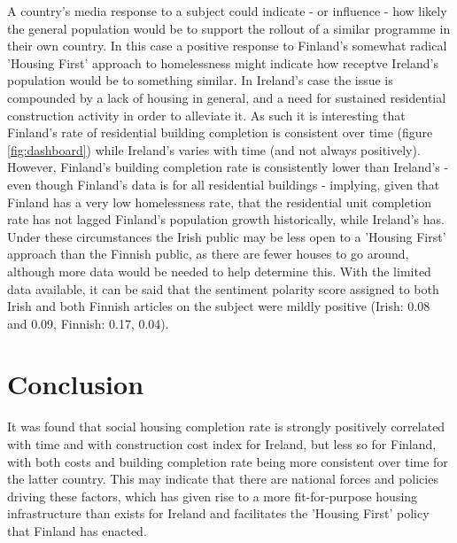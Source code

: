 \documentclass[hidelinks,12pt,oneside]{report} %
\begin{document}
A country's media response to a subject could indicate - or influence - how likely the general population would be to support the rollout of a similar programme in their own country. In this case a positive response to Finland's somewhat radical 'Housing First' approach to homelessness might indicate how receptve Ireland's population would be to something similar. In Ireland's case the issue is compounded by a lack of housing in general, and a need for sustained residential construction activity in order to alleviate it. As such it is interesting that Finland's rate of residential building completion is consistent over time (figure \ref{fig:dashboard}) while Ireland's varies with time (and not always positively). However, Finland's building completion rate is consistently lower than Ireland's - even though Finland's data is for all residential buildings - implying, given that Finland has a very low homelessness rate, that the residential unit completion rate has not lagged Finland's population growth historically, while Ireland's has. Under these circumstances the Irish public may be less open to a 'Housing First' approach than the Finnish public, as there are fewer houses to go around, although more data would be needed to help determine this. With the limited data available, it can be said that the sentiment polarity score assigned to both Irish and both Finnish articles on the subject were mildly positive (Irish: 0.08 and 0.09, Finnish: 0.17, 0.04).

\chapter{Conclusion}
It was found that social housing completion rate is strongly positively correlated with time and with construction cost index for Ireland, but less so for Finland, with both costs and building completion rate being more consistent over time for the latter country. This may indicate that there are national forces and policies driving these factors, which has given rise to a more fit-for-purpose housing infrastructure than exists for Ireland and facilitates the 'Housing First' policy that Finland has enacted.

\printbibliography
 
\end{document}
